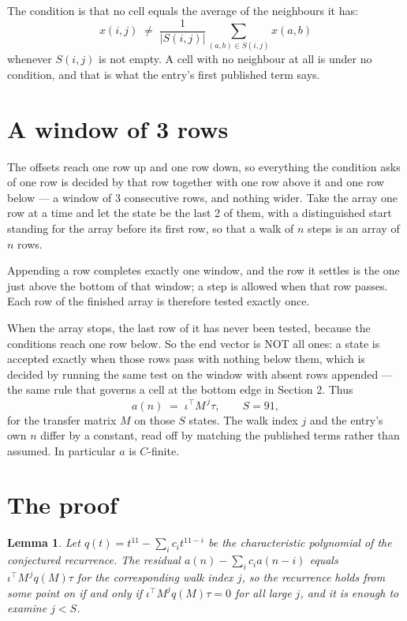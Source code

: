 \documentclass[11pt,a4paper]{article}
\theoremstyle{plain}
\newtheorem{lemma}[theorem]{Lemma}
\theoremstyle{definition}
\begin{document}
The condition is that no cell equals the average of the neighbours it has:
\[
x(i,j)\;\neq\;\frac{1}{|S(i,j)|}\sum_{(a,b)\in S(i,j)}x(a,b)
\]
whenever $S(i,j)$ is not empty. A cell with no neighbour at all is under no condition, and that is what the entry's first published term says.

\section{A window of 3 rows}

The offsets reach one row up and one row down, so everything the condition asks of one row is
decided by that row together with one row above it and one row below --- a window of
$3$ consecutive rows, and nothing wider. Take the array one row at a time
and let the state be the last 2 of them, with a distinguished start standing for the
array before its first row, so that a walk of $n$ steps is an array of $n$ rows.

Appending a row completes exactly one window, and the row it settles is the one just above the bottom of that window; a step is
allowed when that row passes. Each row of the finished
array is therefore tested exactly once.

When the array stops, the last row of it has never been tested, because the
conditions reach one row below. So the end vector is NOT all ones: a state is accepted exactly when
those rows pass with nothing below them, which is decided by running the same test on the window
with absent rows appended --- the same rule that governs a cell at the bottom edge in
Section 2.
Thus
\[
a(n)\;=\;\iota^{\!\top}M^{\,j}\tau ,\qquad S=91,
\]
for the transfer matrix $M$ on those $S$ states. The walk index $j$ and the entry's own $n$
differ by a constant, read off by matching the published terms rather than assumed. In
particular $a$ is $C$-finite.

\section{The proof}

\begin{lemma}\label{lem:crit}
Let $q(t)=t^{11}-\sum_i c_it^{11-i}$ be the characteristic polynomial of the
conjectured recurrence. The residual $a(n)-\sum_ic_ia(n-i)$ equals
$\iota^{\!\top}M^{\,j}q(M)\tau$ for the corresponding walk index $j$, so the recurrence
holds from some point on if and only if $\iota^{\!\top}M^{j}q(M)\tau=0$ for all large $j$,
and it is enough to examine $j<S$.
\end{lemma}
\end{document}

